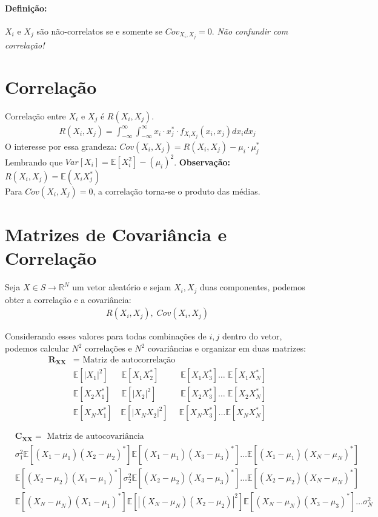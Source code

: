 \documentclass{article}
\begin{document}
\paragraph*{Definição:}
$X_i$ e $X_j$ são não-correlatos se e somente se $Cov_{X_i,X_j} = 0$. \textit{Não confundir com
correlação!}

\section{Correlação}
Correlação entre $X_i$ e $X_j$ é $R(X_i,X_j)$.
\begin{align*}
    R(X_i,X_j) = \int^{\infty}_{-\infty} \int^{\infty}_{-\infty} x_i \cdot x_j^* \cdot f_{X_i X_j}(x_i,x_j) dx_i dx_j
\end{align*}
O interesse por essa grandeza: $Cov(X_i,X_j) = R(X_i,X_j) - \mu_i \cdot \mu_j^*$
\\
Lembrando que $Var[X_i] = \mathbb{E}[X_i^2] - (\mu_i)^2$. \textbf{Observação:} $R(X_i,X_j) = \mathbb{E}(X_iX_j^*)$
\\
Para $Cov(X_i,X_j) = 0$, a correlação torna-se o produto das
médias.

\section{Matrizes de Covariância e Correlação}
Seja $X \in S \to \mathbb{R}^N$ um vetor aleatório e sejam $X_i, X_j$ duas componentes, podemos
obter a correlação e a covariância:
\begin{align*}
    R(X_i,X_j), \; Cov(X_i,X_j)
\end{align*}

Considerando esses valores para todas combinações de $i, j$ dentro do vetor, podemos calcular
$N^2$ correlações e $N^2$ covariâncias e organizar em duas matrizes:
\begin{align*}
    \mathbf{R_{XX}} &= \text{ Matriz de autocorrelação} \\
    &\mathbb{E}[|X_1|^2] \quad\;\; \mathbb{E}[X_1X_2^*] \qquad\;\; \mathbb{E}[X_1X_3^*] \ldots\;
    \mathbb{E}[X_1X_N^*] \\
    &\mathbb{E}[X_2X_1^*] \quad\; \mathbb{E}[|X_2|^2] \qquad\;\;\; \mathbb{E}[X_2X_3^*] \ldots\;
    \mathbb{E}[X_2X_N^*] \\
    &\mathbb{E}[X_NX_1^*] \quad \mathbb{E}[|X_NX_2|^2] \quad\; \mathbb{E}[X_NX_3^*] \ldots \mathbb{E}[X_NX_N^*]
\end{align*}

\vspace{-2.75em}
\begin{align*}
&\mathbf{C_{XX}} = \text{ Matriz de autocovariância} & & &\\
&\sigma_1^2 \mathbb{E}[(X_1-\mu_1)(X_2-\mu_2)^*] \mathbb{E}[(X_1-\mu_1)(X_3-\mu_3)^*] \ldots
\mathbb{E}[(X_1-\mu_1)(X_N-\mu_N)^*] \\
&\mathbb{E}[(X_2-\mu_2)(X_1-\mu_1)^*] \sigma_2^2 \mathbb{E}[(X_2-\mu_2)(X_3-\mu_3)^*] \ldots
\mathbb{E}[(X_2-\mu_2)(X_N-\mu_N)^*] \\
&\mathbb{E}[(X_N-\mu_N)(X_1-\mu_1)^*] \mathbb{E}[|(X_N-\mu_N)(X_2-\mu_2)|^2]
\mathbb{E}[(X_N-\mu_N)(X_3-\mu_3)^*] \ldots \sigma_N^2
\end{align*}
\end{document}
